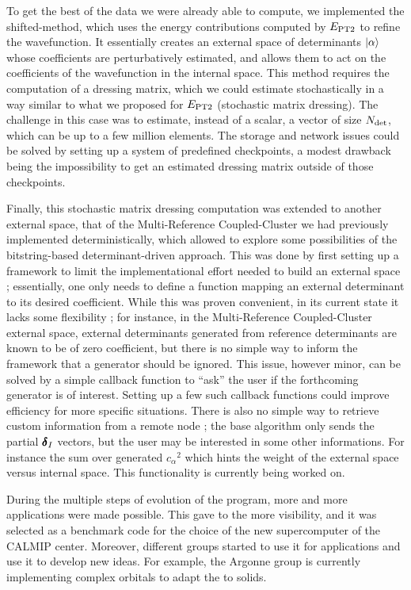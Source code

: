 \documentclass[12pt,a4paper]{report}
\begin{document}
To get the best of the data we were already able to compute, we implemented the shifted-\Bk method, which uses the energy contributions computed by $E_\text{PT2}$ to refine the wavefunction. It essentially creates an external space of determinants ${\ket{\alpha}}$ whose coefficients are perturbatively estimated, and allows them to act on the coefficients of the wavefunction in the internal space. This method requires the computation of a dressing matrix, which we could estimate stochastically in a way similar to what we proposed for $E_\text{PT2}$ (stochastic matrix dressing).
The challenge in this case was to estimate, instead of a scalar, a vector of size ${N_\text{det}}$, which can be up to a few million elements. The storage and network issues could be solved by setting up a system of predefined checkpoints, a modest drawback being the impossibility to get an estimated dressing matrix outside of those checkpoints.

Finally, this stochastic matrix dressing computation was extended to another external space, that of the Multi-Reference Coupled-Cluster we had previously implemented deterministically,\cite{Garniron_2017} which allowed to explore some possibilities of the bitstring-based determinant-driven approach.
This was done by first setting up a framework to limit the implementational effort needed to build an external space ; essentially, one only needs to define a function mapping an external determinant to its desired coefficient. While this was proven convenient, in its current state it lacks some flexibility ; for instance, in the Multi-Reference Coupled-Cluster external space, external determinants generated from reference determinants are known to be of zero coefficient, but there is no simple way to inform the framework that a generator should be ignored. This issue, however minor, can be solved by a simple callback function to ``ask'' the user if the forthcoming generator is of interest. Setting up a few such callback functions could improve efficiency for more specific situations. There is also no simple way to retrieve custom information from a remote node ; the base algorithm only sends the partial $\pmb \delta_I$ vectors, but the user may be interested in some other informations. For instance the sum over generated ${c_\alpha}^2$ which hints the weight of the external space versus internal space. This functionality is currently being worked on.


During the multiple steps of evolution of the program, more and more applications were made possible.\cite{Loos_2018,Garniron_2018,Giner_2017,Garniron_2017,Garniron_2017b,Scemama_2018,1806.05115} This gave to the \QP more visibility, and it was selected as a benchmark code for the choice of the new supercomputer of the CALMIP center. Moreover, different groups started to use it for applications and use it to develop new ideas. For example, the Argonne group is currently implementing complex orbitals to 
adapt the \QP to solids.
\end{document}
